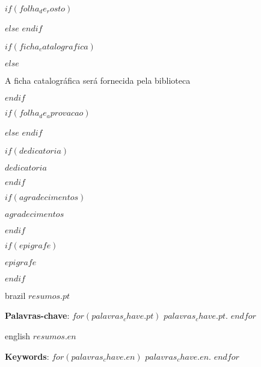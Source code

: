 \documentclass[
	oldfontcommands,
	sumario=abnt-6027-2012,
	12pt,
	openright,
	oneside,
	a4paper,
	english,
	brazil
	]{imecc-unicamp}
\begin{document}
\frenchspacing

\pretextual
\imprimirprimeirafolha

$if(folha_de_rosto)$
  \begin{folhaderosto}
  
  \end{folhaderosto}
$else$
  \imprimirfolhaderosto
$endif$

\begin{fichacatalografica}
  $if(ficha_catalografica)$
    
  $else$
    \begin{center}
  {\ABNTEXchapterfont\large A ficha catalográfica será fornecida pela biblioteca}
    \end{center}
  $endif$
\end{fichacatalografica}

\begin{folhadeaprovacao}
  $if(folha_de_aprovacao)$
    
  $else$
  $endif$
\end{folhadeaprovacao}

$if(dedicatoria)$
  \begin{dedicatoria}
     \vspace*{\fill}
     \centering
     \noindent
     \textit{
        $dedicatoria$
     }
     \vspace*{\fill}
  \end{dedicatoria}
$endif$

$if(agradecimentos)$
  \begin{agradecimentos}
  $agradecimentos$
  \end{agradecimentos}
$endif$

$if(epigrafe)$
  \begin{epigrafe}
      \vspace*{\fill}
      \begin{flushright}
  	\textit{$epigrafe$}
      \end{flushright}
  \end{epigrafe}
  $endif$

\setlength{\absparsep}{18pt}
\begin{resumo}[Resumo]
 \begin{otherlanguage*}{brazil}
    $resumos.pt$

    \textbf{Palavras-chave}: $for(palavras_chave.pt)$ $palavras_chave.pt$. $endfor$
 \end{otherlanguage*}
\end{resumo}
\begin{resumo}[Abstract]
 \begin{otherlanguage*}{english}
    $resumos.en$

    \textbf{Keywords}: $for(palavras_chave.en)$ $palavras_chave.en$. $endfor$
 \end{otherlanguage*}
\end{resumo}
\end{document}
